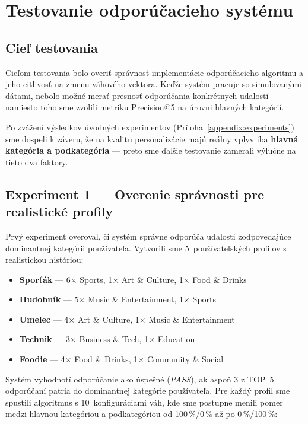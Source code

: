 \section{Testovanie odporúčacieho systému}

\subsection{Cieľ testovania}

Cieľom testovania bolo overiť správnosť implementácie odporúčacieho algoritmu
a jeho citlivosť na zmenu váhového vektora. Keďže systém pracuje so simulovanými
dátami, nebolo možné merať presnosť odporúčania konkrétnych udalostí — namiesto
toho sme zvolili metriku Precision@5 na úrovni hlavných kategórií.

Po zvážení výsledkov úvodných experimentov (Príloha~\ref{appendix:experiments})
sme dospeli k záveru, že na kvalitu personalizácie majú reálny vplyv iba
\textbf{hlavná kategória a podkategória} — preto sme ďalšie testovanie zamerali
výlučne na tieto dva faktory.

\subsection{Experiment 1 — Overenie správnosti pre realistické profily}

Prvý experiment overoval, či systém správne odporúča udalosti zodpovedajúce
dominantnej kategórii používateľa. Vytvorili sme 5~používateľských profilov
s realistickou históriou:

\begin{itemize}
    \item \textbf{Sporťák} — 6$\times$ Sports, 1$\times$ Art \& Culture, 1$\times$ Food \& Drinks
    \item \textbf{Hudobník} — 5$\times$ Music \& Entertainment, 1$\times$ Sports
    \item \textbf{Umelec} — 4$\times$ Art \& Culture, 1$\times$ Music \& Entertainment
    \item \textbf{Technik} — 3$\times$ Business \& Tech, 1$\times$ Education
    \item \textbf{Foodie} — 4$\times$ Food \& Drinks, 1$\times$ Community \& Social
\end{itemize}

Systém vyhodnotí odporúčanie ako úspešné (\textit{PASS}), ak aspoň 3 z TOP~5
odporúčaní patria do dominantnej kategórie používateľa. Pre každý profil sme
spustili algoritmus s 10~konfiguráciami váh, kde sme postupne menili pomer medzi
hlavnou kategóriou a podkategóriou od 100\,\%/0\,\% až po 0\,\%/100\,\%:

